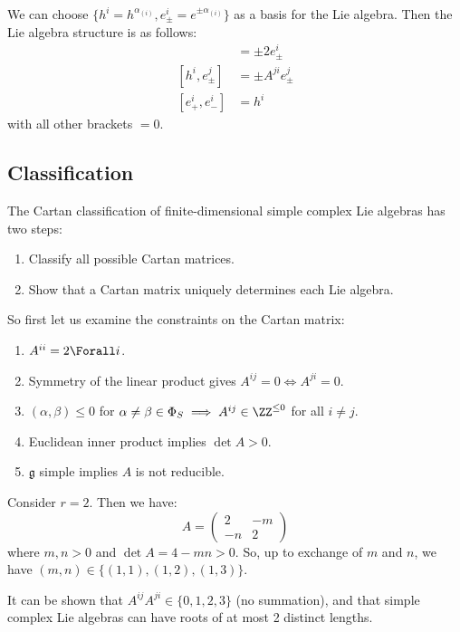 \documentclass{jknotes}
\begin{document}
We can choose \(\{h^i=h^{\alpha_{(i)}},e_\pm^i=e^{\pm\alpha_{(i)}}\}\) as a basis for the Lie algebra. Then the Lie algebra structure is as follows:
\begin{align}
    [h^i,e_\pm^i] &= \pm2e_\pm^i \\
    [h^i,e_\pm^j] &= \pm A^{ji} e^j_\pm \\
    [e_+^i, e_-^i] &= h^i
\end{align}
with all other brackets \(=0\).

\subsection{Classification}
The Cartan classification of finite-dimensional simple complex Lie algebras has two steps:
\begin{enumerate}
    \item Classify all possible Cartan matrices.
    \item Show that a Cartan matrix uniquely determines each Lie algebra.
\end{enumerate}

So first let us examine the constraints on the Cartan matrix:
\begin{enumerate}[label=(\alph*)]
    \item \(A^{ii} = 2 \Forall i\).
    \item Symmetry of the linear product gives \(A^{ij} = 0 \iff A^{ji} = 0\).
    \item \((\alpha,\beta) \le 0\) for \(\alpha \ne \beta \in \Phi_S \implies A^{ij} \in \ZZ^{\le 0}\) for all \(i \ne j\).
    \item Euclidean inner product implies \(\det A > 0\).
    \item \(\mathfrak{g}\) simple implies \(A\) is not reducible.
\end{enumerate}

\begin{eg}
    Consider \(r=2\). Then we have:
    \begin{equation}
        A = 
        \begin{pmatrix}
            2 & -m \\
            -n & 2
        \end{pmatrix}
    \end{equation}
    where \(m,n>0\) and \(\det A = 4-mn > 0\). So, up to exchange of \(m\) and \(n\), we have \((m,n) \in \{(1,1),(1,2),(1,3)\}\).
\end{eg}

It can be shown that \(A^{ij}A^{ji} \in \{0,1,2,3\}\) (no summation), and that simple complex Lie algebras can have roots of at most 2 distinct lengths.
\end{document}

